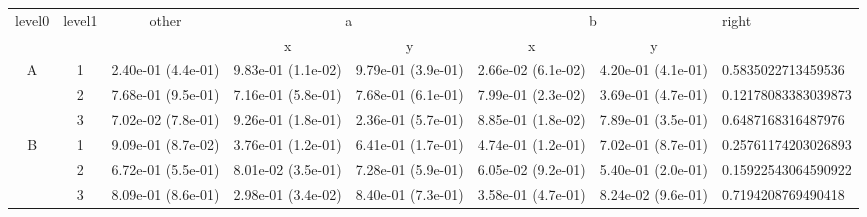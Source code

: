 \begin{tabular}{cccccccl}
\toprule
\multirow{2}{*}{level0} & \multirow{2}{*}{level1}& \multirow{2}{*}{other}&\multicolumn{2}{c}{a}&\multicolumn{2}{c}{b}& \multirow{2}{*}{right}\tabularnewline
\cmidrule(lr){4-5}
\cmidrule(lr){6-7}
&&&x&y&x&y\tabularnewline
\midrule
\multirow{3}{*}{A}&1& 2.40e-01 (4.4e-01)& 9.83e-01 (1.1e-02)& 9.79e-01 (3.9e-01)& 2.66e-02 (6.1e-02)& 4.20e-01 (4.1e-01)& 0.5835022713459536\tabularnewline
&2& 7.68e-01 (9.5e-01)& 7.16e-01 (5.8e-01)& 7.68e-01 (6.1e-01)& 7.99e-01 (2.3e-02)& 3.69e-01 (4.7e-01)& 0.12178083383039873\tabularnewline
&3& 7.02e-02 (7.8e-01)& 9.26e-01 (1.8e-01)& 2.36e-01 (5.7e-01)& 8.85e-01 (1.8e-02)& 7.89e-01 (3.5e-01)& 0.6487168316487976\tabularnewline
\midrule
\multirow{3}{*}{B}&1& 9.09e-01 (8.7e-02)& 3.76e-01 (1.2e-01)& 6.41e-01 (1.7e-01)& 4.74e-01 (1.2e-01)& 7.02e-01 (8.7e-01)& 0.25761174203026893\tabularnewline
&2& 6.72e-01 (5.5e-01)& 8.01e-02 (3.5e-01)& 7.28e-01 (5.9e-01)& 6.05e-02 (9.2e-01)& 5.40e-01 (2.0e-01)& 0.15922543064590922\tabularnewline
&3& 8.09e-01 (8.6e-01)& 2.98e-01 (3.4e-02)& 8.40e-01 (7.3e-01)& 3.58e-01 (4.7e-01)& 8.24e-02 (9.6e-01)& 0.7194208769490418\tabularnewline
\bottomrule
\end{tabular}

